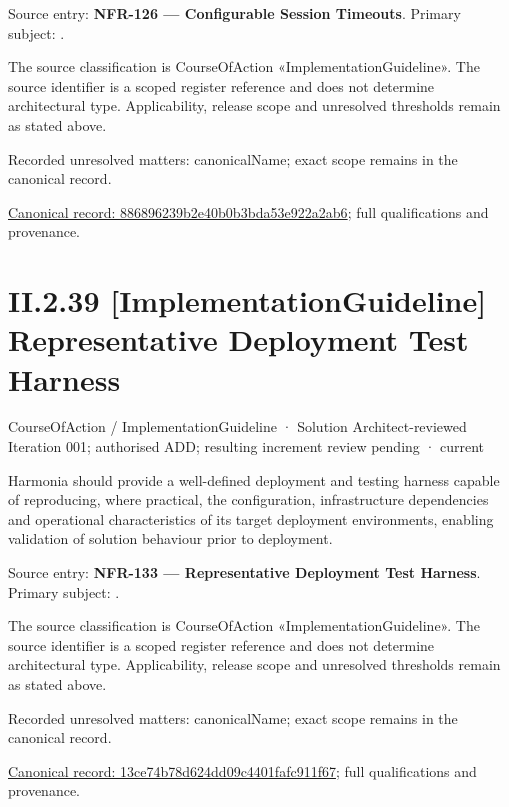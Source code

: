 Source entry: \textbf{NFR-126 — Configurable Session Timeouts}. Primary subject: \texttt{}.



The source classification is CourseOfAction «ImplementationGuideline». The source identifier is a scoped register reference and does not determine architectural type. Applicability, release scope and unresolved thresholds remain as stated above.


{\small Recorded unresolved matters: canonicalName; exact scope remains in the canonical record.}\par
{\footnotesize \href{../../../../../../../continuum/strategy/course-of-action/implementation-guideline/886896239b2e40b0b3bda53e922a2ab6.md}{Canonical record: 886896239b2e40b0b3bda53e922a2ab6}; full qualifications and provenance.}\par
\section*{II.2.39 [ImplementationGuideline] Representative Deployment Test Harness}
\label{navigation:II.2.39}

\label{element:13ce74b78d624dd09c4401fafc911f67}
{\small CourseOfAction / ImplementationGuideline · Solution Architect-reviewed Iteration 001; authorised ADD; resulting increment review pending · current}\par

Harmonia should provide a well-defined deployment and testing harness capable of reproducing, where practical, the configuration, infrastructure dependencies and operational characteristics of its target deployment environments, enabling validation of solution behaviour prior to deployment.



Source entry: \textbf{NFR-133 — Representative Deployment Test Harness}. Primary subject: \texttt{}.



The source classification is CourseOfAction «ImplementationGuideline». The source identifier is a scoped register reference and does not determine architectural type. Applicability, release scope and unresolved thresholds remain as stated above.


{\small Recorded unresolved matters: canonicalName; exact scope remains in the canonical record.}\par
{\footnotesize \href{../../../../../../../continuum/strategy/course-of-action/implementation-guideline/13ce74b78d624dd09c4401fafc911f67.md}{Canonical record: 13ce74b78d624dd09c4401fafc911f67}; full qualifications and provenance.}\par
